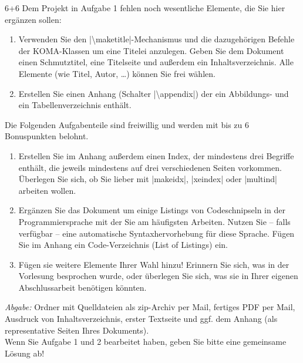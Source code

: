 \documentclass{scrartcl}
\newcommand{\abgabe}[1]{\par\noindent\textit{Abgabe:} #1}
\begin{document}
\begin{question}[subtitle=Erweiterung des Dokuments]{6+6}
Dem Projekt in Aufgabe 1 fehlen noch wesentliche Elemente, die Sie hier ergänzen sollen:
\begin{enumerate}[label=\alph*)]
\item Verwenden Sie den |\textbackslash maketitle|-Mechanismus und die dazugehörigen Befehle der  KOMA-Klassen um eine Titelei anzulegen. Geben Sie dem Dokument einen Schmutztitel, eine Titelseite und außerdem ein Inhaltsverzeichnis. Alle Elemente (wie Titel, Autor, …) können Sie frei wählen.
\item Erstellen Sie einen Anhang (Schalter |\textbackslash appendix|) der ein Abbildungs- und ein Tabellenverzeichnis enthält.
\end{enumerate}
Die Folgenden Aufgabenteile sind freiwillig und werden mit bis zu 6 Bonuspunkten belohnt.
\begin{enumerate}[resume,label=\alph*)]
\item Erstellen Sie im Anhang außerdem einen Index, der mindestens drei Begriffe enthält, die jeweils mindestens auf drei verschiedenen Seiten vorkommen. Überlegen Sie sich, ob Sie lieber mit |makeidx|, |xeindex| oder |multind| arbeiten wollen.
\item Ergänzen Sie das Dokument um einige Listings von Codeschnipseln in der Programmiersprache mit der Sie am häufigsten Arbeiten. Nutzen Sie – falls verfügbar – eine automatische Syntaxhervorhebung für diese Sprache. Fügen Sie im Anhang ein Code-Verzeichnis (List of Listings) ein.
\item Fügen sie weitere Elemente Ihrer Wahl hinzu! Erinnern Sie sich, was in der Vorlesung besprochen wurde, oder überlegen Sie sich, was sie in Ihrer eigenen Abschlussarbeit benötigen könnten.
\end{enumerate}
	\abgabe{Ordner mit Quelldateien als zip-Archiv per Mail, fertiges PDF per Mail, Ausdruck von Inhaltsverzeichnis, erster Textseite und ggf. dem Anhang (als representative Seiten Ihres Dokuments).\\ Wenn Sie Aufgabe 1 und  2 bearbeitet haben, geben Sie bitte eine gemeinsame Lösung ab!}
\end{question}
 

\newsavebox{\SolutionCodeA}
\begin{lrbox}{\SolutionCodeA}
\begin{minipage}{\textwidth}
\end{minipage}
\end{lrbox}

\begin{solution}
\noindent\usebox\SolutionCodeA
\end{solution}
\end{document}
